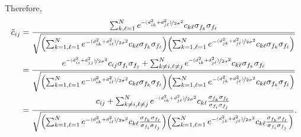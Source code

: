 \documentclass{article}
\begin{document}
Therefore,
\begin{align}
    \Tilde{c}_{ij} &= \frac{\sum_{k, \ell =1}^N e^{\nicefrac{-(d_{ik}^2+d_{j\ell}^2)}{2\sigma^2}}c_{k\ell}\sigma_{f_k}\sigma_{f_\ell}}{\sqrt{\qty(\sum_{k=1, \ell=1}^N e^{-\nicefrac{(d_{ik}^2+ d_{i\ell}^2)}{2\sigma^2}}c_{k\ell}\sigma_{f_k}\sigma_{f_\ell})\qty(\sum_{k=1, \ell=1}^N e^{-\nicefrac{(d_{jk}^2+ d_{j\ell}^2)}{2\sigma^2}}c_{k\ell}\sigma_{f_k}\sigma_{f_\ell})}} \nonumber \\
    &= \frac{e^{\nicefrac{-(d_{ii}^2+d_{jj}^2)}{2\sigma^2}}c_{ij}\sigma_{f_i}\sigma_{f_j} + \sum_{k\neq i, \ell \neq j}^N e^{\nicefrac{-(d_{ik}^2+d_{j\ell}^2)}{2\sigma^2}}c_{k\ell}\sigma_{f_k}\sigma_{f_\ell}}{\sqrt{\qty(\sum_{k=1, \ell=1}^N e^{-\nicefrac{(d_{ik}^2+ d_{i\ell}^2)}{2\sigma^2}}c_{k\ell}\sigma_{f_k}\sigma_{f_\ell})\qty(\sum_{k=1, \ell=1}^N e^{-\nicefrac{(d_{jk}^2+ d_{j\ell}^2)}{2\sigma^2}}c_{k\ell}\sigma_{f_k}\sigma_{f_\ell})}} \nonumber \\
    &= \frac{c_{ij}+\sum_{k\neq i, \ell \neq j}^N e^{\nicefrac{-(d_{ik}^2+d_{j\ell}^2)}{2\sigma^2}}c_{k\ell}\frac{\sigma_{f_k}\sigma_{f_\ell}}{\sigma_{f_i}\sigma_{f_j}}}{\sqrt{\qty(\sum_{k=1, \ell=1}^N e^{-\nicefrac{(d_{ik}^2+ d_{i\ell}^2)}{2\sigma^2}}c_{k\ell}\frac{\sigma_{f_k}\sigma_{f_\ell}}{\sigma_{f_i}\sigma_{f_j}})\qty(\sum_{k=1, \ell=1}^N e^{-\nicefrac{(d_{jk}^2+ d_{j\ell}^2)}{2\sigma^2}}c_{k\ell}\frac{\sigma_{f_k}\sigma_{f_\ell}}{\sigma_{f_i}\sigma_{f_j}})}}.
    \label{eq:additive_correction}
\end{align}
\end{document}
